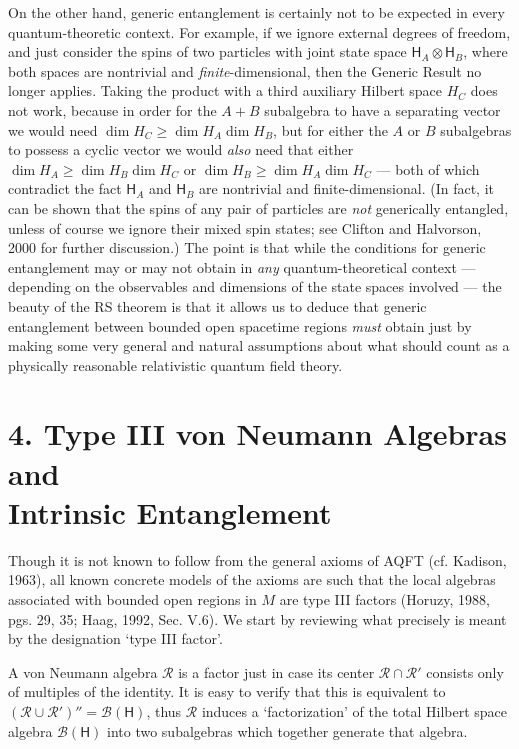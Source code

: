 \documentclass[12pt]{article}
\newcommand{\alg}[1]{\mbox{$\mathcal{#1}$}}
\newcommand{\hil}[1]{\mbox{$\mathsf{#1}$}}
\begin{document}
On the other hand, generic entanglement is certainly not to be expected in every 
quantum-theoretic context.  For example, if we ignore external degrees of freedom, and 
just consider the spins of two particles with joint state space 
$\hil{H}_{A}\otimes\hil{H}_{B}$, where both 
spaces are nontrivial and \emph{finite}-dimensional,  
then the Generic Result no longer applies.  Taking the product with a 
third auxiliary Hilbert space $H_{C}$ does not work, because in order 
for the $A+B$ subalgebra to have a separating vector we would need 
$\dim H_{C}\geq \dim H_{A}\dim H_{B}$, but for either the $A$ or $B$ subalgebras 
to possess a cyclic vector we would \emph{also} need that either 
$\dim H_{A}\geq \dim H_{B}\dim H_{C}$ or 
$\dim H_{B}\geq \dim H_{A}\dim H_{C}$ --- both of which contradict the 
fact  $\hil{H}_{A}$ and $\hil{H}_{B}$ are nontrivial and 
finite-dimensional.    
(In fact, it can be shown 
that the spins of any pair of particles are \emph{not} generically 
entangled, unless of course we ignore their mixed spin states; see Clifton and 
Halvorson, 2000 for further discussion.)  
The point is that while the conditions for 
generic entanglement may or 
may not obtain in \emph{any} quantum-theoretical context --- depending 
on the observables and dimensions of the state spaces involved --- the 
beauty of the RS theorem is that it allows us to deduce that generic 
entanglement between bounded open spacetime regions 
\emph{must} obtain just by making some very general and natural 
assumptions about what should count as a 
physically reasonable relativistic quantum field theory.

\section*{4. Type III von Neumann Algebras and \\  Intrinsic Entanglement}

 Though it is not known to follow from the general axioms of AQFT 
 (cf. Kadison, 
 1963), all known concrete 
 models of the axioms are such that the local algebras associated with 
 bounded open regions in $M$ are type 
 III factors (Horuzy, 1988, pgs. 29, 35; Haag, 1992, Sec. V.6).  We start 
  by reviewing 
 what precisely is meant by the designation `type III factor'.
 
 A von Neumann algebra $\alg{R}$ is a factor just in case its center 
 $\alg{R}\cap\alg{R}'$ consists only of multiples of the identity.  
 It is easy to verify that this is equivalent to 
 $(\alg{R}\cup\alg{R}')''=\alg{B}(\hil{H})$, thus $\alg{R}$ induces a 
 `factorization' of
 the total Hilbert space algebra $\alg{B}(\hil{H})$ into two subalgebras which together 
 generate that algebra.  
\end{document}
